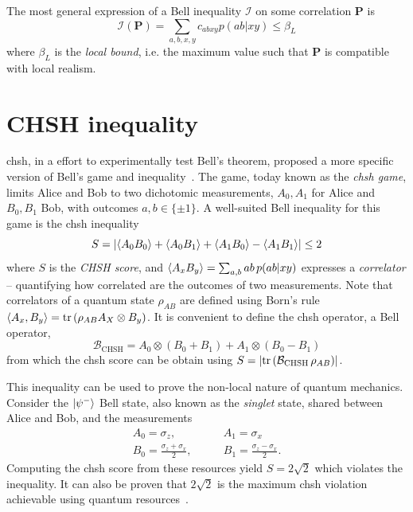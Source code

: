 \medbreak

The most general expression of a Bell inequality $\mathcal{I}$ on some correlation $\mathbf{P}$ is
\begin{equation}
	\mathcal{I}(\mathbf{P}) = \sum_{a,b,x,y}c_{abxy} p(ab|xy) \leq \beta_L
	\label{eq:bell_inequality}
\end{equation}
where $\beta_L$ is the \textit{local bound}, i.e. the maximum value such that $\mathbf{P}$ is compatible with local realism.

\section{CHSH inequality}

\acrfull{chsh}, in a effort to experimentally test Bell's theorem, proposed a more specific version of Bell's game and inequality~\cite{Clauser1969}.
The game, today known as the \textit{\acrshort{chsh} game}, limits Alice and Bob to two dichotomic measurements, $A_0,A_1$ for Alice and $B_0,B_1$ Bob, with outcomes $a,b\in\{\pm 1\}$. 
A well-suited Bell inequality for this game is the \acrshort{chsh} inequality 
\begin{equation}
	S = \left | \langle {A_0 B_0} \rangle + \langle {A_0 B_1} \rangle + \langle {A_1 B_0} \rangle - \langle {A_1 B_1} \rangle  \right | \leq 2
	\label{eq:CHSH}
\end{equation}
where $S$ is the \textit{CHSH score}, and $\langle {A_x B_y} \rangle = \sum_{a,b} ab\,p(ab|xy)$ expresses a \textit{correlator} -- quantifying how correlated are the outcomes of two measurements.
Note that correlators of a quantum state $\rho_{AB}$ are defined using Born's rule $\mean{A_x,B_y} = \trr{\rho_{AB} A_X \otimes B_y}$.
It is convenient to define the \acrshort{chsh} operator, a Bell operator,
\begin{equation}
	\mathcal{B}_{\mathrm{CHSH}} = A_0 \otimes \left( B_0 + B_1 \right) + A_1 \otimes \left( B_0 - B_1 \right)
	\label{eq:CHSH_operator}
\end{equation}
from which the \acrshort{chsh} score can be obtain using $S = \left| \trr{\mathcal{B}_\mathrm{CHSH}\, \rho_{AB} } \right|$.

\medbreak

This inequality can be used to prove the non-local nature of quantum mechanics. 
Consider the $\ket{\psi^-}$ Bell state, also known as the \textit{singlet} state, shared between Alice and Bob, and the measurements
\begin{equation}
	\begin{split}
		A_0 = \sigma_z, \quad & \quad A_1 = \sigma_x \\
		B_0 = \frac{\sigma_z+\sigma_x}{2}, \quad &\quad B_1 = \frac{\sigma_z - \sigma_x}{2}.
		\label{eq:CHSH_measurement}
	\end{split}
\end{equation}
Computing the \acrshort{chsh} score from these resources yield $S=2\sqrt{2}$ which violates the inequality.
It can also be proven that $2\sqrt{2}$ is the maximum \acrshort{chsh} violation achievable using quantum resources~\cite{Tsirelson1980}.

